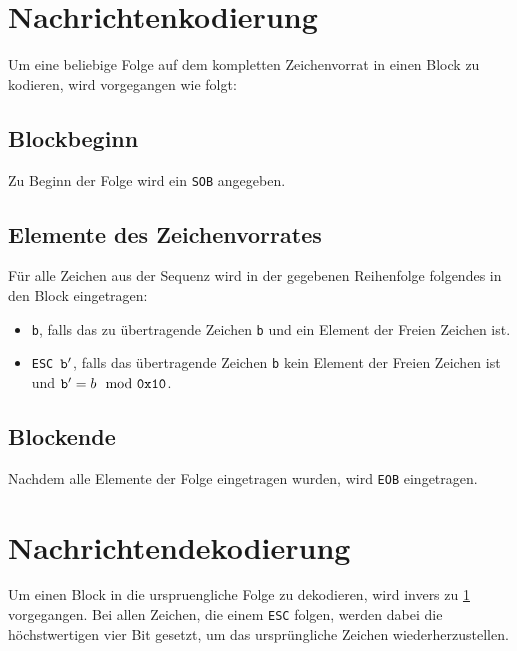 \section{Nachrichtenkodierung}\label{j-lsp-encoding}
Um eine beliebige Folge auf dem kompletten Zeichenvorrat in einen Block
zu kodieren, wird vorgegangen wie folgt:

\subsection{Blockbeginn}
Zu Beginn der  Folge wird ein {\tt SOB} angegeben.

\subsection{Elemente des Zeichenvorrates}
F\"ur alle Zeichen aus der Sequenz wird in der gegebenen Reihenfolge folgendes
in den Block eingetragen:
\begin{itemize}
  \item{{\tt b}, falls das zu \"ubertragende Zeichen {\tt b} und ein Element der
    Freien Zeichen ist.}
  \item{{\tt ESC $\text{\tt b}^\prime$}, falls das \"ubertragende Zeichen {\tt b} kein
    Element der Freien Zeichen ist und $\text{\tt b}^\prime = b \mod \text{\tt 0x10}$.
  }
\end{itemize}

\subsection{Blockende}
Nachdem alle Elemente der Folge eingetragen wurden, wird {\tt EOB} eingetragen.


\section{Nachrichtendekodierung}
Um einen Block in die urspruengliche Folge zu dekodieren, wird invers zu \ref{j-lsp-encoding}
vorgegangen. Bei allen Zeichen, die einem {\tt ESC} folgen, werden dabei die h\"ochstwertigen
vier Bit gesetzt, um das urspr\"ungliche Zeichen wiederherzustellen.

